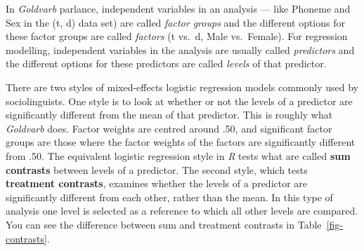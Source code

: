 \documentclass[
  10pt,
  letterpaper]{article}
\renewcommand\texttt[1]{{\ttfamily\color{BrickRed}#1}}
\begin{document}
\begin{tcolorbox}[enhanced jigsaw, colbacktitle=quarto-callout-caution-color!10!white, opacityback=0, left=2mm, breakable, bottomrule=.15mm, colback=white, colframe=quarto-callout-caution-color-frame, toprule=.15mm, arc=.35mm, rightrule=.15mm, toptitle=1mm, opacitybacktitle=0.6, bottomtitle=1mm, coltitle=black, leftrule=.75mm, titlerule=0mm, title=\textcolor{quarto-callout-caution-color}{\faFire}\hspace{0.5em}{Factors, Factor Groups, Predictors, Levels --- What's the difference?}]

In \emph{Goldvarb} parlance, independent variables in an analysis ---
like \texttt{Phoneme} and \texttt{Sex} in the (t, d) data set) are
called \emph{factor groups} and the different options for these factor
groups are called \emph{factors} (\texttt{t} vs.~\texttt{d},
\texttt{Male} vs.~\texttt{Female}). For regression modelling,
independent variables in the analysis are usually called
\emph{predictors} and the different options for these predictors are
called \emph{levels} of that predictor.

\end{tcolorbox}

There are two styles of mixed-effects logistic regression models
commonly used by sociolinguists. One style is to look at whether or not
the levels of a predictor are significantly different from the mean of
that predictor. This is roughly what \emph{Goldvarb} does. Factor
weights are centred around .50, and significant factor groups are those
where the factor weights of the factors are significantly different from
.50. The equivalent logistic regression style in \emph{R} tests what are
called \textbf{sum contrasts} between levels of a predictor. The second
style, which tests \textbf{treatment contrasts}, examines whether the
levels of a predictor are significantly different from each other,
rather than the mean. In this type of analysis one level is selected as
a reference to which all other levels are compared. You can see the
difference between sum and treatment contrasts in
Table~\ref{fig-contrasts}.
\end{document}
